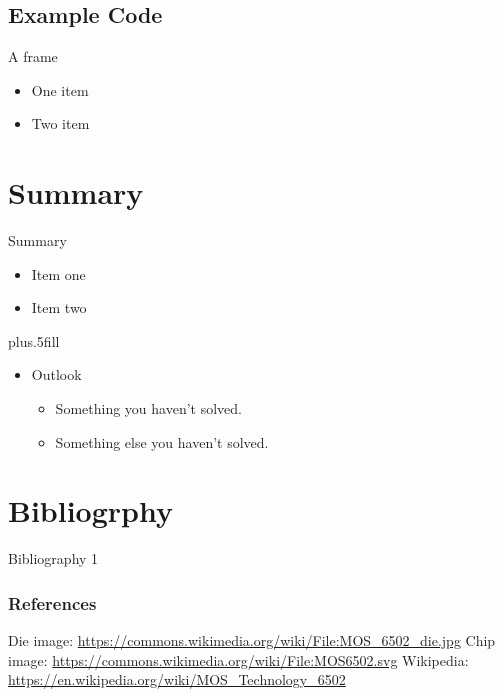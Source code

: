 \documentclass{beamer}
\begin{document}
\subsection[Examples]{Example Code}

\begin{frame}{A frame}
  \begin{itemize}
  \item
    One item
  \item
    Two item
  \end{itemize}
\end{frame}




\section{Summary}

\begin{frame}{Summary}

  \begin{itemize}
  \item
    Item one
  \item
    Item two
  \end{itemize}
  
  \vskip0pt plus.5fill
  \begin{itemize}
  \item
    Outlook
    \begin{itemize}
    \item
      Something you haven't solved.
    \item
      Something else you haven't solved.
    \end{itemize}
  \end{itemize}
\end{frame}

\section{Bibliogrphy}

\begin{frame}{Bibliography 1}
  \frametitle{References}
  \begin{thebibliography}{MOS 6502 Die}
    Die image: {\url{https://commons.wikimedia.org/wiki/File:MOS_6502_die.jpg}}
    Chip image: {\url{https://commons.wikimedia.org/wiki/File:MOS6502.svg}}
    Wikipedia: {\url{https://en.wikipedia.org/wiki/MOS_Technology_6502}}
  \end{thebibliography}
\end{frame}
\end{document}
